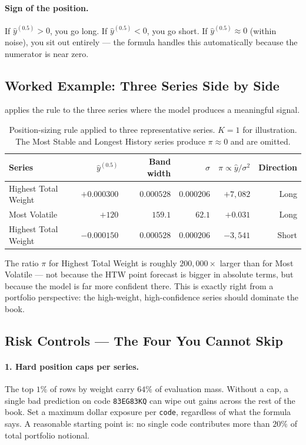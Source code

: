 \paragraph{Sign of the position.} If $\hat{y}^{(0.5)} > 0$, you go long. If $\hat{y}^{(0.5)} < 0$, you go short. If $\hat{y}^{(0.5)} \approx 0$ (within noise), you sit out entirely --- the formula handles this automatically because the numerator is near zero.

\subsection{Worked Example: Three Series Side by Side}

 applies the rule to the three series where the model produces a meaningful signal.

\begin{table}[htbp]
\centering
\caption{Position-sizing rule applied to three representative series. $K = 1$ for illustration. The Most Stable and Longest History series produce $\pi \approx 0$ and are omitted.}
\label{tab:worked_example}
\begin{tabular}{l r r r r r}
\toprule
Series & $\hat{y}^{(0.5)}$ & Band width & $\sigma$ & $\pi \propto \hat{y}/\sigma^2$ & Direction \\
\midrule
Highest Total Weight & $+0.000300$ & $0.000528$ & $0.000206$ & $+7{,}082$ & Long \\
Most Volatile        & $+120$      & $159.1$    & $62.1$     & $+0.031$   & Long \\
Highest Total Weight & $-0.000150$ & $0.000528$ & $0.000206$ & $-3{,}541$ & Short \\
\bottomrule
\end{tabular}
\end{table}

The ratio $\pi$ for Highest Total Weight is roughly $200{,}000\times$ larger than for Most Volatile --- not because the HTW point forecast is bigger in absolute terms, but because the model is far more confident there. This is exactly right from a portfolio perspective: the high-weight, high-confidence series should dominate the book.

\subsection{Risk Controls --- The Four You Cannot Skip}

\paragraph{1. Hard position caps per series.}
The top $1\%$ of rows by weight carry $64\%$ of evaluation mass. Without a cap, a single bad prediction on code \texttt{83EG83KQ} can wipe out gains across the rest of the book. Set a maximum dollar exposure per \texttt{code}, regardless of what the formula says. A reasonable starting point is: no single code contributes more than $20\%$ of total portfolio notional.

